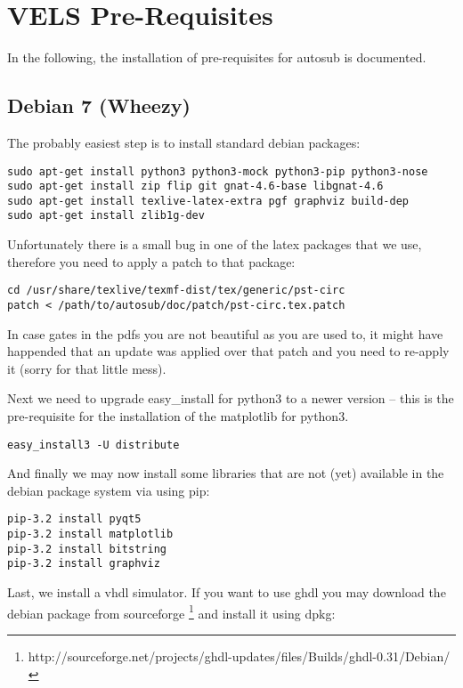 \section{VELS Pre-Requisites} \label{system_prerequisites}

In the following, the installation of pre-requisites for autosub is documented.

\subsection{Debian 7 (Wheezy)}

The probably easiest step is to install standard debian packages:

\begin{verbatim}
sudo apt-get install python3 python3-mock python3-pip python3-nose 
sudo apt-get install zip flip git gnat-4.6-base libgnat-4.6 
sudo apt-get install texlive-latex-extra pgf graphviz build-dep
sudo apt-get install zlib1g-dev
\end{verbatim}

Unfortunately there is a small bug in one of the latex packages that we use,
therefore you need to apply a patch to that package:

\begin{verbatim}
cd /usr/share/texlive/texmf-dist/tex/generic/pst-circ
patch < /path/to/autosub/doc/patch/pst-circ.tex.patch
\end{verbatim}

In case gates in the pdfs you are not beautiful as you are used to, it might have
happended that an update was applied over that patch and you need to re-apply it (sorry for that little mess).


Next we need to upgrade easy\_install for python3 to a newer version -- this
is the pre-requisite for the installation of the matplotlib for python3.

\begin{verbatim}
easy_install3 -U distribute
\end{verbatim}

And finally we may now install some libraries that are not (yet) available in
the debian package system via using pip:

\begin{verbatim}
pip-3.2 install pyqt5
pip-3.2 install matplotlib
pip-3.2 install bitstring
pip-3.2 install graphviz
\end{verbatim}

Last, we install a vhdl simulator. If you want to use ghdl you may download
the debian package from sourceforge \footnote{http://sourceforge.net/projects/ghdl-updates/files/Builds/ghdl-0.31/Debian/} and install it using dpkg:

